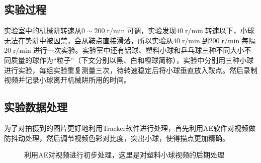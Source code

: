 \documentclass{WHUReport}
\begin{document}
\begin{multicols}{2}
	\subsection{实验过程}
	实验室中的机械阱转速从$0\sim 200\operatorname{r/min}$可调，实验发现$ 40\operatorname{r/min}$转速以下，小球无法在势阱中被囚禁，会从鞍点直接滑落，所以实验从$ 40\operatorname{r/min}$到$ 200\operatorname{r/min}$每隔$ 20\operatorname{r/min}$进行一次实验。实验室中还有铝球、塑料小球和乒乓球三种不同大小不同质量的球作为“粒子”（下文分别以黑、白和橙球简称），实验中分别用三种小球进行实验，每组实验重复测量三次，待转速稳定后将小球垂直放入鞍点。然后录制视频并记录小球离开机械阱所用的时间。
	\subsection{实验数据处理}
	为了对拍摄到的图片更好地利用Tracker软件进行处理，首先利用AE软件对视频做防抖动处理，然后调节视频色彩对比度，突出小球，使得描点更加精确。
	\begin{figure}[H]
		\centering  %
		\subfigbottomskip=2pt %
		\subfigcapskip=-5pt %
		\caption{利用AE对视频进行初步处理，这里是对塑料小球视频的后期处理}
	\end{figure}
	

\end{multicols}
\end{document}
